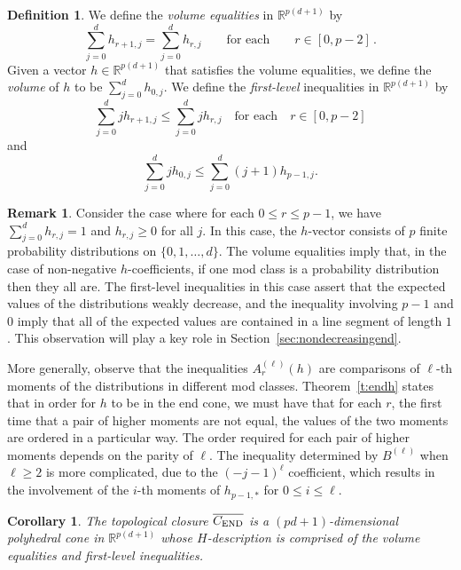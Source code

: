 \documentclass[12pt]{amsart}
\newtheorem{cor}[thm]{Corollary}
\theoremstyle{definition}
\newtheorem{remark}[thm]{Remark}
\newtheorem{defn}[thm]{Definition}
\numberwithin{equation}{section}
\renewcommand\>{\rangle}
\newcommand\<{\langle}
\newcommand\0{\mathbf{0}}
\newcommand\RR{\mathbb{R}}
\begin{document}
\begin{defn}\label{def:volumefirstlevel}
We define the \emph{volume equalities} in $\RR^{p(d+1)}$ by 
\[
\sum_{j=0}^d h_{r+1,j}
= \sum_{j=0}^d h_{r,j}
\qquad \text{for each} \qquad
r \in [0, p-2] \, .
\]
Given a vector $h\in \RR^{p(d+1)}$ that satisfies the volume equalities, we define the \emph{volume} of $h$ to be $\sum_{j=0}^{d}h_{0,j}$.
We define the \emph{first-level} inequalities in $\RR^{p(d+1)}$ by
\[
\sum_{j=0}^d jh_{r+1,j}
\le \sum_{j=0}^d jh_{r,j}
\quad \text{for each} \quad
r \in [0, p-2]
\]
and
\[
\sum_{j=0}^d jh_{0,j}
\le \sum_{j=0}^d (j+1)h_{p-1,j}.
\]
\end{defn}

\begin{remark}\label{rem:expectation}
Consider the case where for each $0\leq r\leq p-1$, we have $\sum_{j=0}^dh_{r,j}=1$ and $h_{r,j}\geq 0$ for all $j$.
In this case, the $h$-vector consists of $p$ finite probability distributions on $\{0,1,\ldots,d\}$.
The volume equalities imply that, in the case of non-negative $h$-coefficients, if one mod class is a probability distribution then they all are.
The first-level inequalities in this case assert that the expected values of the distributions weakly decrease, and the inequality involving $p-1$ and $0$ imply that all of the expected values are contained in a line segment of length $1$.
This observation will play a key role in Section~\ref{sec:nondecreasingend}.

More generally, observe that the inequalities $A_r^{(\ell)}(h)$ are comparisons of $\ell$-th moments of the distributions in different mod classes.
Theorem~\ref{t:endh} states that in order for $h$ to be in the end cone, we must have that for each $r$, the first time that a pair of higher moments are not equal, the values of the two moments are ordered in a particular way.
The order required for each pair of higher moments depends on the parity of $\ell$. 
The inequality determined by $B^{(\ell)}$ when $\ell\geq 2$ is more complicated, due to the $(-j-1)^{\ell}$ coefficient, which results in the involvement of the $i$-th moments of $h_{p-1,*}$ for $0\leq i\leq \ell$.
\end{remark}

\begin{cor}\label{c:endclosure}
The topological closure $\overline{C_\textnormal{END}}$ is a $(pd + 1)$-dimensional polyhedral cone in $\RR^{p(d+1)}$ whose $H$-description is comprised of the volume equalities and first-level inequalities.  
\end{cor}
\end{document}
